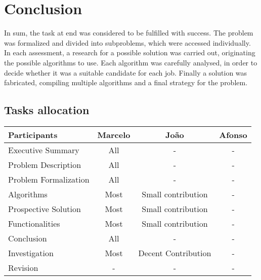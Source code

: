 \chapter{Conclusion}

In sum, the task at end was considered to be fulfilled with success. The problem was formalized and divided into subproblems, which were accessed individually. In each assessment, a research for a possible solution was carried out, originating the possible algorithms to use. Each algorithm was carefully analysed, in order to decide whether it was a suitable candidate for each job. Finally a solution was fabricated, compiling multiple algorithms and a final strategy for the problem.

\section{Tasks allocation}
\begin{center}
    \begin{tabular}{l | c  c  c}
        \textbf{Participants}           & \textbf{Marcelo} & \textbf{João} & \textbf{Afonso} \\ \hline
        Executive Summary                     & All & - & - \\
        Problem Description                   & All & - & -   \\
        Problem Formalization                 & All & - & - \\
        Algorithms                            & Most & Small contribution & -   \\
        Prospective Solution                  & Most & Small contribution & -   \\
        Functionalities                       & Most & Small contribution & -   \\
        Conclusion                            & All & - & -   \\
        Investigation                         & Most & Decent Contribution & - \\
        Revision                              & - & - & - 
    \end{tabular}
\end{center}